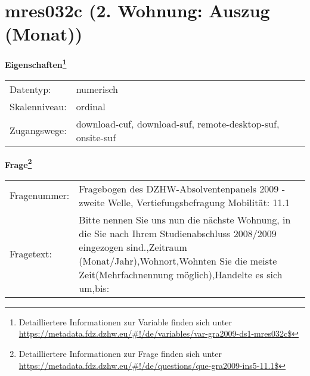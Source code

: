 
    \setcounter{footnote}{0}

    \vspace*{-1.8cm}
	\section{mres032c (2. Wohnung: Auszug (Monat))}
	\label{section:mres032c}



    \vspace*{0.5cm}
    \noindent\textbf{Eigenschaften\footnote{Detailliertere Informationen zur Variable finden sich unter
		\url{https://metadata.fdz.dzhw.eu/\#!/de/variables/var-gra2009-ds1-mres032c$}}}\\
	\begin{tabularx}{\hsize}{@{}lX}
	Datentyp: & numerisch \\
	Skalenniveau: & ordinal \\
	Zugangswege: &
	  download-cuf, 
	  download-suf, 
	  remote-desktop-suf, 
	  onsite-suf
 \\
    \end{tabularx}



				\vspace*{0.5cm}
                \noindent\textbf{Frage\footnote{Detailliertere Informationen zur Frage finden sich unter
		              \url{https://metadata.fdz.dzhw.eu/\#!/de/questions/que-gra2009-ins5-11.1$}}}\\
				\begin{tabularx}{\hsize}{@{}lX}
					Fragenummer: &
					  Fragebogen des DZHW-Absolventenpanels 2009 - zweite Welle, Vertiefungsbefragung Mobilität:
					  11.1
 \\
					Fragetext: & Bitte nennen Sie uns nun die nächste Wohnung, in die Sie nach Ihrem Studienabschluss 2008/2009 eingezogen sind.,Zeitraum (Monat/Jahr),Wohnort,Wohnten Sie die meiste Zeit(Mehrfachnennung möglich),Handelte es sich um,bis: \\
				\end{tabularx}





